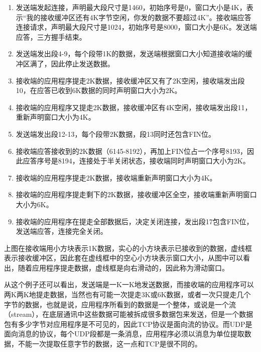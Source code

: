 
\begin{enumerate}

\item 发送端发起连接，声明最大段尺寸是1460，初始序号是0，窗口大小是4K，表示“我的接收缓冲区还有4K字节空闲，你发的数据不要超过4K”。接收端应答连接请求，声明最大段尺寸是1024，初始序号是8000，窗口大小是6K。发送端应答，三方握手结束。

\item 发送端发出段4-9，每个段带1K的数据，发送端根据窗口大小知道接收端的缓冲区满了，因此停止发送数据。

\item 接收端的应用程序提走2K数据，接收缓冲区又有了2K空闲，接收端发出段10，在应答已收到6K数据的同时声明窗口大小为2K。

\item 接收端的应用程序又提走2K数据，接收缓冲区有4K空闲，接收端发出段11，重新声明窗口大小为4K。

\item 发送端发出段12-13，每个段带2K数据，段13同时还包含FIN位。

\item 接收端应答接收到的2K数据（6145-8192），再加上FIN位占一个序号8193，因此应答序号是8194，连接处于半关闭状态，接收端同时声明窗口大小为2K。

\item 接收端的应用程序提走2K数据，接收端重新声明窗口大小为4K。

\item 接收端的应用程序提走剩下的2K数据，接收缓冲区全空，接收端重新声明窗口大小为6K。

\item 接收端的应用程序在提走全部数据后，决定关闭连接，发出段17包含FIN位，发送端应答，连接完全关闭。
\end{enumerate}


上图在接收端用小方块表示1K数据，实心的小方块表示已接收到的数据，虚线框表示接收缓冲区，因此套在虚线框中的空心小方块表示窗口大小，从图中可以看出，随着应用程序提走数据，虚线框是向右滑动的，因此称为滑动窗口。



从这个例子还可以看出，发送端是一K一K地发送数据，而接收端的应用程序可以两K两K地提走数据，当然也有可能一次提走3K或6K数据，或者一次只提走几个字节的数据，也就是说，应用程序所看到的数据是一个整体，或说是一个流（stream），在底层通讯中这些数据可能被拆成很多数据包来发送，但是一个数据包有多少字节对应用程序是不可见的，因此TCP协议是面向流的协议。而UDP是面向消息的协议，每个UDP段都是一条消息，应用程序必须以消息为单位提取数据，不能一次提取任意字节的数据，这一点和TCP是很不同的。

